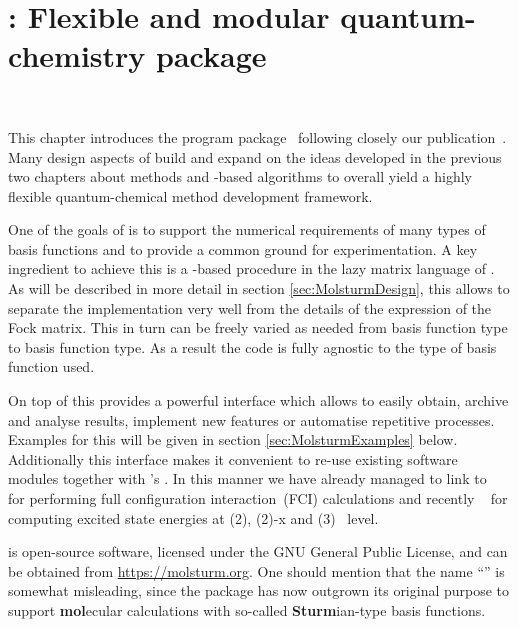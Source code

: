 \chapter{\molsturm: Flexible and modular quantum-chemistry package}
\label{ch:Molsturm}
 \\


\noindent
This chapter introduces the \molsturm program package~\cite{molsturmWeb}
following closely our publication~\cite{molsturmDesign}.
Many design aspects of \molsturm build and expand on the ideas
developed in the previous two chapters about \SCF methods
and \contraction-based algorithms
to overall
yield a highly flexible quantum-chemical method development framework.

One of the goals of \molsturm is to support the numerical requirements
of many types of basis functions and to provide a common ground
for experimentation.
A key ingredient to achieve this
is a \contraction-based \SCF procedure in the lazy matrix language of \lazyten.
As will be described in more detail in section \vref{sec:MolsturmDesign},
this allows to separate the \SCF implementation very well
from the details of the \contraction expression of the Fock matrix.
This in turn can be freely varied as needed from basis function type
to basis function type.
As a result the \SCF code is fully agnostic to the type of basis function used.

On top of this \molsturm provides a powerful \python interface
which allows to easily obtain, archive and analyse results,
implement new features or automatise repetitive processes.
Examples for this will be given in section \ref{sec:MolsturmExamples} below.
Additionally this interface makes it
convenient to re-use existing software modules
together with \molsturm's \SCF.
In this manner we have already managed to link \molsturm to \pyscf~\cite{Sun2017}
for performing full configuration interaction~(FCI) calculations
and recently \adcman~\cite{Wormit2014}
for computing excited state energies at \ADC(2),
\ADC(2)-x and \ADC(3)~\cite{Schirmer1982,Trofimov1999} level.

\molsturm is open-source software, licensed under the
GNU General Public License, and can be obtained from \url{https://molsturm.org}.
One should mention that the name ``\molsturm'' is somewhat misleading,
since the package has now outgrown its original purpose to support
\textbf{mol}ecular calculations with so-called \textbf{Sturm}ian-type
basis functions.





